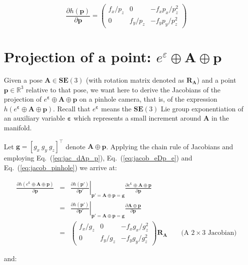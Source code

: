 \documentclass[a4paper,11pt]{report}
\newcommand{\E}{{\bm{\varepsilon}}}
\newcommand{\A}{{\mathbf{A}}}
\begin{document}
\begin{equation}
\label{eq:jacob_pinhole}
\frac{\partial h(\mathbf{p})}{\partial \mathbf{p}} =
\left(
\begin{array}{ccc}
 f_x/p_z  &    0    &  -f_x p_x/p_z^2   \\
 0 & f_y/p_z  &  -f_y p_y/ p_z^2
\end{array}
\right)
\end{equation}


\section{Projection of a point: $e^\varepsilon \oplus \mathbf{A} \oplus \mathbf{p}$}

Given a pose $\mathbf{A} \in \mathbf{SE}(3)$
(with rotation matrix denoted as $\mathbf{R_A}$)
and a point
$\mathbf{p} \in \mathbb{R}^3$
relative to that pose, we want here to derive the Jacobians of
the projection of $e^\E \oplus \A \oplus \mathbf{p}$ on a pinhole camera, that is,
of the expression $h(e^\E \oplus \A \oplus \mathbf{p})$.
Recall that $e^\E$ means the $\mathbf{SE}(3)$ Lie group exponentiation
of an auxiliary variable $\E$ which represents a small increment around $\A$ in the manifold.

Let $\mathbf{g}=[g_x ~ g_y ~ g_z]^\top$ denote $\mathbf{A} \oplus \mathbf{p}$.
Applying the chain rule of Jacobians and employing Eq.~(\ref{eq:jac_dAp_p}),
Eq.~(\ref{eq:jacob_eDp_e})
and  Eq.~(\ref{eq:jacob_pinhole})
we arrive at:

\begin{eqnarray}
\frac{\partial h(e^\E \oplus \A \oplus \mathbf{p})}{\partial \mathbf{p}}
&=&
\left. \frac{\partial h(\mathbf{p'})}{\partial \mathbf{p'}} \right|_{ \mathbf{p'} = \A \oplus \mathbf{p} = \mathbf{g} }
\frac{\partial e^\E \oplus \A \oplus \mathbf{p} }{\partial \mathbf{p}} \\
&=&
\left. \frac{\partial h(\mathbf{p'})}{\partial \mathbf{p'}} \right|_{ \mathbf{p'} = \A \oplus \mathbf{p} = \mathbf{g} }
\frac{\partial \A \oplus \mathbf{p} }{\partial \mathbf{p}} \\
&=&
\left(
\begin{array}{ccc}
 f_x / g_z   &    0    &  -f_x g_x / g_z^2   \\
 0 & f_y / g_z  &  -f_y g_y / g_z^2
\end{array}
\right)
\mathbf{R_A}
\quad\quad \text{(A $2 \times 3$ Jacobian)}
\end{eqnarray}

\noindent and:
\end{document}

